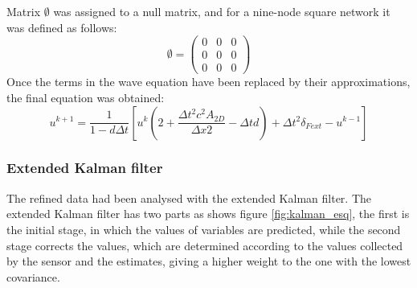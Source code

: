 \documentclass[12pt, a4paper]{article} %
\begin{document}
	Matrix $\emptyset$ was assigned to a null matrix, and for a nine-node square network it was defined as follows:
	\begin{equation} \label{eqn:matrixI}
		\emptyset = 
		\begin{pmatrix}
			0 & 0 & 0\\
			0 & 0 & 0\\
			0 & 0 & 0
		\end{pmatrix}
	\end{equation}
	Once the terms in the wave equation have been replaced by their approximations, the final equation was obtained:
	\begin{equation} \label{eqn:uk+1}
		u^{k + 1} = \frac{1}{1 - d\Delta t} \left[u^{k} \left(2+ \frac{\Delta t^{2} c^{2} A_{2D}}{\Delta x{2}} - \Delta t d\right) + \Delta t^{2} \delta_{Fext} - u^{k - 1}\right]
	\end{equation}
	\setlength{\parskip}{0mm}
	\subsubsection{Extended Kalman filter}
	
	The refined data had been analysed with the extended Kalman filter. The extended Kalman filter has two parts as shows figure \ref{fig:kalman_esq}, the first is the initial stage, in which the values of variables are predicted, while the second stage corrects the values, which are determined according to the values collected by the sensor and the estimates, giving a higher weight to the one with the lowest covariance. 
	
\end{document}
